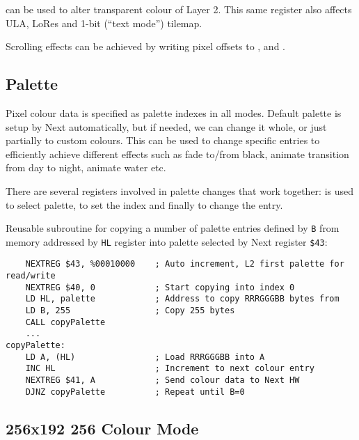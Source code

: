 \documentclass[12pt,twoside,openright,a4paper]{book}
\begin{document}
 can be used to alter transparent colour of Layer 2. This same register also affects ULA, LoRes and 1-bit (``text mode'') tilemap.

Scrolling effects can be achieved by writing pixel offsets to ,  and .


\subsection{Palette}

Pixel colour data is specified as palette indexes in all modes. Default palette is setup by Next automatically, but if needed, we can change it whole, or just partially to custom colours. This can be used to change specific entries to efficiently achieve different effects such as fade to/from black, animate transition from day to night, animate water etc.

There are several registers involved in palette changes that work together:  is used to select palette,  to set the index and finally  to change the entry.

Reusable subroutine for copying a number of palette entries defined by {\tt B} from memory addressed by {\tt HL} register into palette selected by Next register {\tt \$43}:

\begin{lstlisting}
	NEXTREG $43, %00010000    ; Auto increment, L2 first palette for read/write
	NEXTREG $40, 0            ; Start copying into index 0
	LD HL, palette            ; Address to copy RRRGGGBB bytes from
	LD B, 255                 ; Copy 255 bytes
	CALL copyPalette
	...
copyPalette:
	LD A, (HL)                ; Load RRRGGGBB into A
	INC HL                    ; Increment to next colour entry
	NEXTREG $41, A            ; Send colour data to Next HW
	DJNZ copyPalette          ; Repeat until B=0
\end{lstlisting}


\pagebreak
\subsection{256x192 256 Colour Mode}
\end{document}
